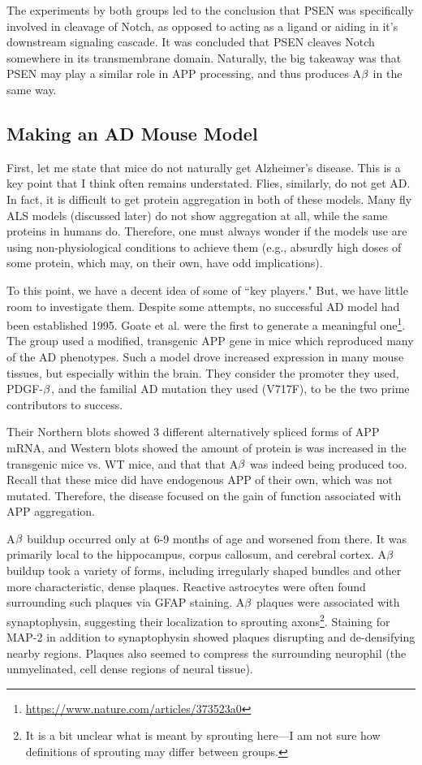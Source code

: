 The experiments by both groups led to the conclusion that PSEN was specifically involved in cleavage of Notch, as opposed to acting as a ligand or aiding in it's downstream signaling cascade. It was concluded that PSEN cleaves Notch somewhere in its transmembrane domain. Naturally, the big takeaway was that PSEN may play a similar role in APP processing, and thus produces A$\beta$ in the same way.


\subsection*{Making an AD Mouse Model}

First, let me state that mice do not naturally get Alzheimer's disease. This is a key point that I think often remains understated. Flies, similarly, do not get AD. In fact, it is difficult to get protein aggregation in both of these models. Many fly ALS models (discussed later) do not show aggregation at all, while the same proteins in humans do. Therefore, one must always wonder if the models use are using non-physiological conditions to achieve them (e.g., absurdly high doses of some protein, which may, on their own, have odd implications). \newline

To this point, we have a decent idea of some of ``key players." But, we have little room to investigate them. Despite some attempts, no successful AD model had been established 1995. Goate et al. were the first to generate a meaningful one\footnote{\url{https://www.nature.com/articles/373523a0}}. The group used a modified, transgenic APP gene in mice which reproduced many of the AD phenotypes. Such a model drove increased expression in many mouse tissues, but especially within the brain. They consider the promoter they used, PDGF-$\beta$, and the familial AD mutation they used (V717F), to be the two prime contributors to success.\newline

Their Northern blots showed 3 different alternatively spliced forms of APP mRNA, and Western blots showed the amount of protein is was increased in the transgenic mice vs. WT mice, and that that A$\beta$ was indeed being produced too. Recall that these mice did have endogenous APP of their own, which was not mutated. Therefore, the disease focused on the gain of function associated with APP aggregation.\newline

A$\beta$ buildup occurred only at 6-9 months of age and worsened from there. It was primarily local to the hippocampus, corpus callosum, and cerebral cortex. A$\beta$ buildup took a variety of forms, including irregularly shaped bundles and other more characteristic, dense plaques. Reactive astrocytes were often found surrounding such plaques via GFAP staining. A$\beta$ plaques were associated with synaptophysin, suggesting their localization to sprouting axons\footnote{It is a bit unclear what is meant by sprouting here---I am not sure how definitions of sprouting may differ between groups.}. Staining for MAP-2 in addition to synaptophysin showed plaques disrupting and de-densifying nearby regions. Plaques also seemed to compress the surrounding neurophil (the unmyelinated, cell dense regions of neural tissue). 

